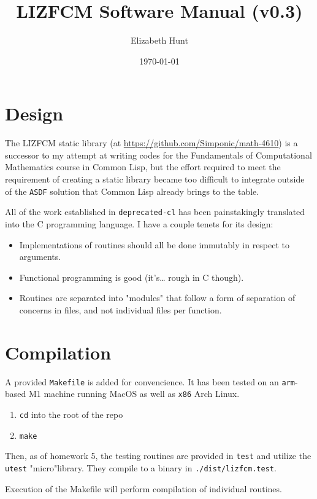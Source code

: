 \documentclass[11pt]{article}
\author{Elizabeth Hunt}
\date{\today}
\title{LIZFCM Software Manual (v0.3)}
\begin{document}
\maketitle
\tableofcontents

\setlength\parindent{0pt}
\section{Design}
\label{sec:orgdac8577}
The LIZFCM static library (at \url{https://github.com/Simponic/math-4610}) is a successor to my
attempt at writing codes for the Fundamentals of Computational Mathematics course in Common
Lisp, but the effort required to meet the requirement of creating a static library became
too difficult to integrate outside of the \texttt{ASDF} solution that Common Lisp already brings
to the table.

All of the work established in \texttt{deprecated-cl} has been painstakingly translated into
the C programming language. I have a couple tenets for its design:

\begin{itemize}
\item Implementations of routines should all be done immutably in respect to arguments.
\item Functional programming is good (it's\ldots{} rough in C though).
\item Routines are separated into "modules" that follow a form of separation of concerns
in files, and not individual files per function.
\end{itemize}
\section{Compilation}
\label{sec:org7755023}
A provided \texttt{Makefile} is added for convencience. It has been tested on an \texttt{arm}-based M1 machine running
MacOS as well as \texttt{x86} Arch Linux.

\begin{enumerate}
\item \texttt{cd} into the root of the repo
\item \texttt{make}
\end{enumerate}

Then, as of homework 5, the testing routines are provided in \texttt{test} and utilize the
\texttt{utest} "micro"library. They compile to a binary in \texttt{./dist/lizfcm.test}.

Execution of the Makefile will perform compilation of individual routines.
\end{document}

